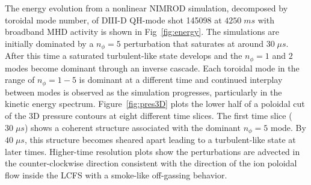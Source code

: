 The energy evolution from a nonlinear NIMROD simulation, decomposed by toroidal
mode number, of DIII-D QH-mode shot 145098 at $4250\;ms$ with broadband MHD
activity is shown in Fig~\ref{fig:energy}.   The simulations are initially
dominated by a $n_\phi=5$ perturbation that saturates at around $30\;\mu s$.
After this time a saturated turbulent-like state develops and the $n_\phi=1$
and $2$ modes become dominant through an inverse cascade.  Each toroidal mode
in the range of $n_\phi=1-5$ is dominant at a different time and continued
interplay between modes is observed as the simulation progresses, particularly in 
the kinetic energy spectrum.
Figure~\ref{fig:pres3D} plots the lower half of a poloidal cut of the 3D
pressure contours at eight different time slices. The first time slice ($30\;\mu
s$) shows a coherent
structure associated with the dominant $n_\phi=5$ mode. By $40\;\mu s$, this
structure becomes sheared apart leading to a turbulent-like state at later
times.  Higher-time resolution plots show the perturbations are advected 
in the counter-clockwise direction consistent with the direction
of the ion poloidal flow inside the LCFS with a smoke-like off-gassing behavior.

